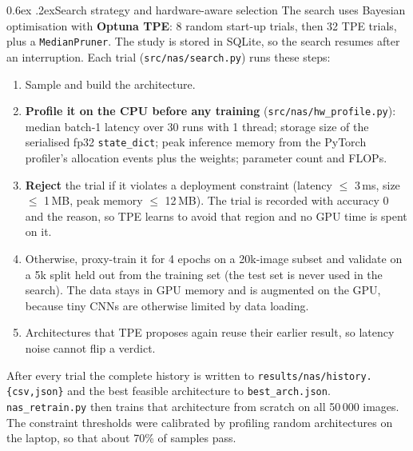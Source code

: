 \documentclass[10pt,a4paper]{article}
\makeatletter
\renewcommand\subsection{\@startsection{subsection}{2}{\z@}{-1.6ex\@plus -1ex \@minus -.2ex}%
  {0.6ex \@plus .2ex}{\normalfont\normalsize\bfseries}}
\newcommand{\code}[1]{\texttt{\small #1}}
\makeatother
\begin{document}
\subsection{Search strategy and hardware-aware selection}
The search uses Bayesian optimisation with \textbf{Optuna TPE}: 8 random start-up trials, then 32 TPE
trials, plus a \code{MedianPruner}. The study is stored in SQLite, so the search resumes after an
interruption. Each trial (\code{src/nas/search.py}) runs these steps:
\begin{enumerate}\itemsep0pt
  \item Sample and build the architecture.
  \item \textbf{Profile it on the CPU before any training} (\code{src/nas/hw\_profile.py}):
  median batch-1 latency over 30 runs with 1 thread; storage size of the serialised fp32
  \code{state\_dict}; peak inference memory from the PyTorch profiler's allocation events plus the
  weights; parameter count and FLOPs.
  \item \textbf{Reject} the trial if it violates a deployment constraint (latency $\le$ 3\,ms,
  size $\le$ 1\,MB, peak memory $\le$ 12\,MB). The trial is recorded with accuracy 0 and the reason,
  so TPE learns to avoid that region and no GPU time is spent on it.
  \item Otherwise, proxy-train it for 4 epochs on a 20k-image subset and validate on a 5k split held
  out from the training set (the test set is never used in the search). The data stays in GPU memory
  and is augmented on the GPU, because tiny CNNs are otherwise limited by data loading.
  \item Architectures that TPE proposes again reuse their earlier result, so latency noise cannot
  flip a verdict.
\end{enumerate}
After every trial the complete history is written to \code{results/nas/history.\{csv,json\}} and the
best feasible architecture to \code{best\_arch.json}. \code{nas\_retrain.py} then trains that
architecture from scratch on all 50\,000 images. The constraint thresholds were calibrated by
profiling random architectures on the laptop, so that about 70\% of samples pass.
\end{document}
